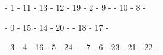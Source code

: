 \ta - 1 - 11 - 13 - 12 - 19 - 2 - 9 - \ta - 10 - 8 - \ta

\tb - 0 - 15 - 14 - 20 - \tb - 18 - 17 - \tb

\tb - 3 - 4 - 16 - 5 - 24 - \tb - 7 - 6 - 23 - 21 - 22 - \tb
\\


